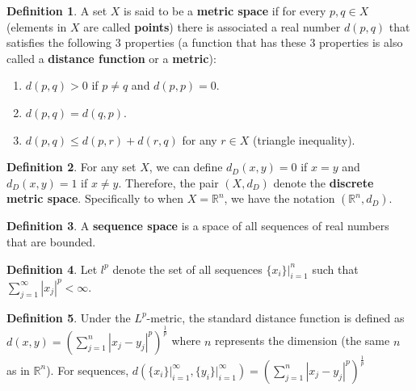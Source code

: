 \documentclass[12pt]{article}
\theoremstyle{definition}
\newtheorem{definition}{Definition}
\theoremstyle{named}
\newcounter{customDef}
\begin{document}
\setcounter{customDef}{0}
\renewcommand{\thedefinition}{2.15}
\begin{definition}
    A set $X$ is said to be a \textbf{metric space} if for every $p,q \in X$ (elements in $X$ are called \textbf{points}) there is associated a real number $d(p,q)$ that satisfies the following 3 properties (a function that has these 3 properties is also called a \textbf{distance function} or a \textbf{metric}):
    \begin{enumerate}
        \item $d(p,q) > 0$ if $p \neq q$ and $d(p,p) = 0$.
        \item $d(p,q) = d(q,p)$.
        \item $d(p,q) \leq d(p,r) + d(r,q)$ for any $r \in X$ \hspace{0.1cm} (triangle inequality). 
    \end{enumerate} 
\end{definition}

\setcounter{customDef}{0}
\renewcommand{\thedefinition}{of Discrete Metric Space}
\begin{definition}
    For any set $X$, we can define $d_D(x,y) = 0$ if $x=y$ and $d_D(x,y)=1$ if $x \neq y$. Therefore, the pair $(X,d_D)$ denote the \textbf{discrete metric space}. Specifically to when $X=\mathbb{R}^n$, we have the notation $(\mathbb{R}^n, d_D)$.
\end{definition}

\setcounter{customDef}{0}
\renewcommand{\thedefinition}{of Sequence Spaces}
\begin{definition}
    A \textbf{sequence space} is a space of all sequences of real numbers that are bounded. 
\end{definition}

\setcounter{customDef}{0}
\renewcommand{\thedefinition}{of $l^p$}
\begin{definition}
    Let $l^p$ denote the set of all sequences $\{x_i\}\biggr\rvert_{i=1}^{n}$ such that $\sum_{j=1}^{\infty} \left|x_j\right|^p < \infty$.
\end{definition}

\setcounter{customDef}{0}
\renewcommand{\thedefinition}{of $L^p$-metric}
\begin{definition}
    Under the $L^p$-metric, the standard distance function is defined as $d(x,y) = \left(\sum_{j=1}^{n} \left|x_j-y_j\right|^p \right)^\frac{1}{p}$ where $n$ represents the dimension (the same $n$ as in $\mathbb{R}^n$). For sequences, $d\left(\{x_i\}\biggr\rvert_{i=1}^{\infty}, \{y_i\}\biggr\rvert_{i=1}^{\infty}\right) = \left(\sum_{j=1}^{n} \left|x_j-y_j\right|^p \right)^\frac{1}{p}$
\end{definition}
\end{document}
